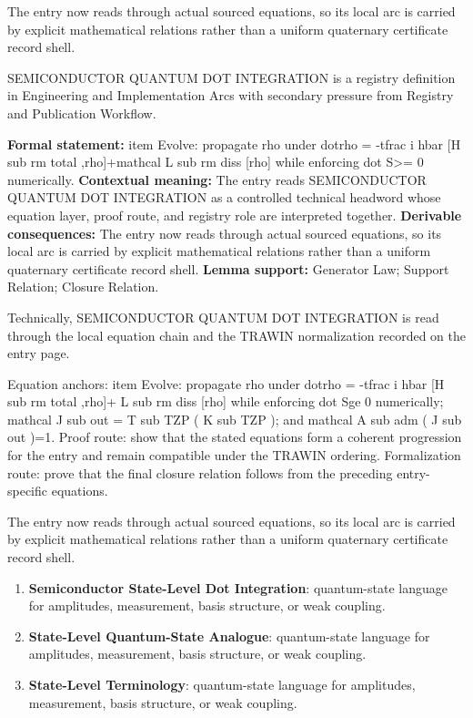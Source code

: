 The entry now reads through actual sourced equations, so its local arc is carried by explicit mathematical relations rather than a uniform quaternary certificate record shell.
\clearpage


\begingroup\small
{}
SEMICONDUCTOR QUANTUM DOT INTEGRATION is a registry definition in Engineering and Implementation Arcs with secondary pressure from Registry and Publication Workflow.

\begingroup\footnotesize\setlength{\emergencystretch}{3em}\sloppy
\textbf{Formal statement:} item Evolve: propagate rho under dotrho = -tfrac i hbar [H sub rm total ,rho]+mathcal L sub rm diss [rho] while enforcing dot S>= 0 numerically. \textbf{Contextual meaning:} The entry reads SEMICONDUCTOR QUANTUM DOT INTEGRATION as a controlled technical headword whose equation layer, proof route, and registry role are interpreted together. \textbf{Derivable consequences:} The entry now reads through actual sourced equations, so its local arc is carried by explicit mathematical relations rather than a uniform quaternary certificate record shell. \textbf{Lemma support:} Generator Law; Support Relation; Closure Relation.\par
\endgroup

Technically, SEMICONDUCTOR QUANTUM DOT INTEGRATION is read through the local equation chain and the TRAWIN normalization recorded on the entry page.

Equation anchors: item Evolve: propagate rho under dotrho = -tfrac i hbar [H sub rm total ,rho]+ L sub rm diss [rho] while enforcing dot Sge 0 numerically; mathcal J sub out = T sub TZP ( K sub TZP ); and mathcal A sub adm ( J sub out )=1. Proof route: show that the stated equations form a coherent progression for the entry and remain compatible under the TRAWIN ordering. Formalization route: prove that the final closure relation follows from the preceding entry-specific equations.

The entry now reads through actual sourced equations, so its local arc is carried by explicit mathematical relations rather than a uniform quaternary certificate record shell.
\endgroup

\begin{enumerate}[leftmargin=1.6em,itemsep=6pt,topsep=4pt]
\item \textbf{Semiconductor State-Level Dot Integration}: quantum-state language for amplitudes, measurement, basis structure, or weak coupling.
\item \textbf{State-Level Quantum-State Analogue}: quantum-state language for amplitudes, measurement, basis structure, or weak coupling.
\item \textbf{State-Level Terminology}: quantum-state language for amplitudes, measurement, basis structure, or weak coupling.
\end{enumerate}

